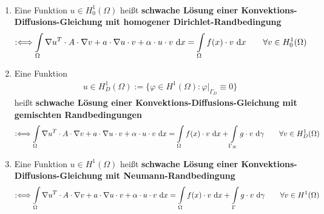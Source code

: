 \begin{definition}\ %
\begin{enumerate}[label=(\roman*)]
\item Eine Funktion $u\in H_0^1(\Omega)$ heißt \textbf{schwache Lösung einer Konvektions-Diffusions-Gleichung mit homogener Dirichlet-Randbedingung}
\begin{align*}
:\Longleftrightarrow
\int\limits_\Omega\nabla u^T\cdot A\cdot\nabla v+a\cdot\nabla u\cdot v+\alpha\cdot u\cdot v\text{ d} x
=\int\limits_\Omega f(x)\cdot v\text{ d} x
\qquad\forall v\in H_0^1(\Omega)
\end{align*}
\item Eine Funktion 
\begin{align*}
u\in H_D^1(\Omega):=\big\lbrace\varphi\in H^1(\Omega):\varphi|_{\Gamma_D}\equiv 0\big\rbrace
\end{align*}
heißt \textbf{schwache Lösung einer Konvektions-Diffusions-Gleichung  mit gemischten Randbedingungen}
\begin{align*}
:\Longleftrightarrow
\int\limits_\Omega \nabla u^T\cdot A\cdot\nabla v+a\cdot\nabla u\cdot v+\alpha\cdot u\cdot v\text{ d} x
=\int\limits_\Omega f(x)\cdot v\text{ d} x+\int\limits_{\Gamma_N}g\cdot v\text{ d}\gamma
\qquad\forall v\in H^1_D(\Omega)
\end{align*}
\item Eine Funktion $u\in H^1(\Omega)$ heißt \textbf{schwache Lösung einer Konvektions-Diffusions-Gleichung mit Neumann-Randbedingung}
\begin{align*}
:\Longleftrightarrow
\int\limits_\Omega\nabla u^T\cdot A\cdot\nabla v+a\cdot\nabla u\cdot v+\alpha\cdot u\cdot v\text{ d} x
=\int\limits_\Omega f(x)\cdot v\text{ d} x+\int\limits_{\Gamma} g\cdot v\text{ d}\gamma
\qquad\forall v\in H^1(\Omega)
\end{align*}
\end{enumerate}
\end{definition}

